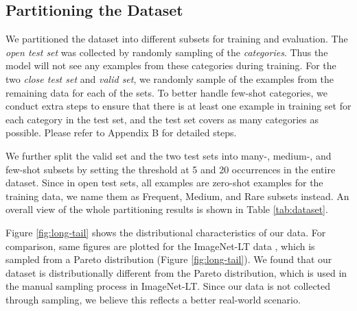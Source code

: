 \documentclass{article}
\begin{document}
\subsection{Partitioning the Dataset}
We partitioned the dataset into different subsets for training and evaluation. The \textit{open test set} was collected by randomly sampling  of the \textit{categories}. Thus the model will not see any examples from these categories during training. For the two \textit{close test set} and \textit{valid set}, we randomly sample  of the examples from the remaining data for each of the sets. To better handle few-shot categories, we conduct extra steps to ensure that there is at least one example in training set for each category in the test set, and the test set covers as many categories as possible. Please refer to Appendix B for detailed steps.

We further split the valid set and the two test sets into many-, medium-, and few-shot subsets by setting the threshold at 5 and 20 occurrences in the entire dataset. Since in open test sets, all examples are zero-shot examples for the training data, we name them as Frequent, Medium, and Rare subsets instead. An overall view of the whole partitioning results is shown in Table \ref{tab:dataset}.

Figure \ref{fig:long-tail} shows the distributional characteristics of our data. For comparison, same figures are plotted for the ImageNet-LT data \cite{liu2019large}, which is sampled from a Pareto distribution (Figure \ref{fig:long-tail}). We found that our dataset is distributionally different from the Pareto distribution, which is used in the manual sampling process in ImageNet-LT. Since our data is not collected through sampling, we believe this reflects a better real-world scenario.
\end{document}
